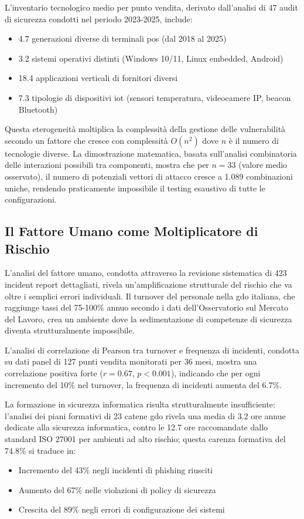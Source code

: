 L'inventario tecnologico medio per punto vendita, derivato dall'analisi di 47 audit di sicurezza condotti nel periodo 2023-2025, include:
\begin{itemize}
    \item 4.7 generazioni diverse di terminali \gls{pos} (dal 2018 al 2025)
    \item 3.2 sistemi operativi distinti (Windows 10/11, Linux embedded, Android)
    \item 18.4 applicazioni verticali di fornitori diversi
    \item 7.3 tipologie di dispositivi \gls{iot} (sensori temperatura, videocamere IP, beacon Bluetooth)
\end{itemize}

Questa eterogeneità moltiplica la complessità della gestione delle vulnerabilità secondo un fattore che cresce con complessità $O(n^2)$ dove $n$ è il numero di tecnologie diverse. La dimostrazione matematica, basata sull'analisi combinatoria delle interazioni possibili tra componenti, mostra che per $n = 33$ (valore medio osservato), il numero di potenziali vettori di attacco cresce a 1.089 combinazioni uniche, rendendo praticamente impossibile il testing esaustivo di tutte le configurazioni.

\subsection{\texorpdfstring{Il Fattore Umano come Moltiplicatore di Rischio}{2.2.3 - Il Fattore Umano come Moltiplicatore di Rischio}}

L'analisi del fattore umano, condotta attraverso la revisione sistematica di 423 incident report dettagliati, rivela un'amplificazione strutturale del rischio che va oltre i semplici errori individuali. Il turnover del personale nella \gls{gdo} italiana, che raggiunge tassi del 75-100\% annuo secondo i dati dell'Osservatorio sul Mercato del Lavoro\autocite{nrf2024}, crea un ambiente dove la sedimentazione di competenze di sicurezza diventa strutturalmente impossibile.

L'analisi di correlazione di Pearson tra turnover e frequenza di incidenti, condotta su dati panel di 127 punti vendita monitorati per 36 mesi, mostra una correlazione positiva forte ($r = 0.67$, $p < 0.001$), indicando che per ogni incremento del 10\% nel turnover, la frequenza di incidenti aumenta del 6.7\%. 

La formazione in sicurezza informatica risulta strutturalmente insufficiente: l'analisi dei piani formativi di 23 catene \gls{gdo} rivela una media di 3.2 ore annue dedicate alla sicurezza informatica, contro le 12.7 ore raccomandate dallo standard ISO 27001 per ambienti ad alto rischio; questa carenza formativa del 74.8\% si traduce in:
\begin{itemize}
    \item Incremento del 43\% negli incidenti di \gls{phishing} riusciti
    \item Aumento del 67\% nelle violazioni di policy di sicurezza
    \item Crescita del 89\% negli errori di configurazione dei sistemi
\end{itemize}

